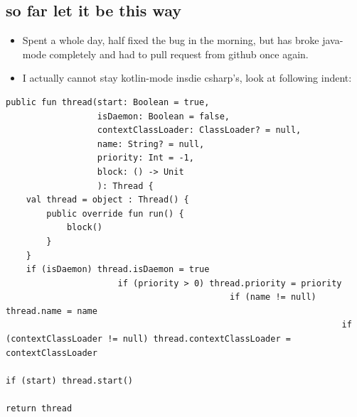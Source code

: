 \documentclass[9pt, b5paper]{article}
\begin{document}
\subsection{so far let it be this way}
\label{sec-1-2}
\begin{itemize}
\item Spent a whole day, half fixed the bug in the morning, but has broke java-mode completely and had to pull request from github once again.
\item I actually cannot stay kotlin-mode insdie csharp's, look at following indent:
\end{itemize}
\begin{verbatim}
public fun thread(start: Boolean = true,
                  isDaemon: Boolean = false,
                  contextClassLoader: ClassLoader? = null,
                  name: String? = null,
                  priority: Int = -1,
                  block: () -> Unit
                  ): Thread {
    val thread = object : Thread() {
        public override fun run() {
            block()
        }
    }
    if (isDaemon) thread.isDaemon = true
                      if (priority > 0) thread.priority = priority
                                            if (name != null) thread.name = name
                                                                  if (contextClassLoader != null) thread.contextClassLoader = contextClassLoader
                                                                                                      if (start) thread.start()   
                                                                                                                     return thread
\end{verbatim}
\end{document}
